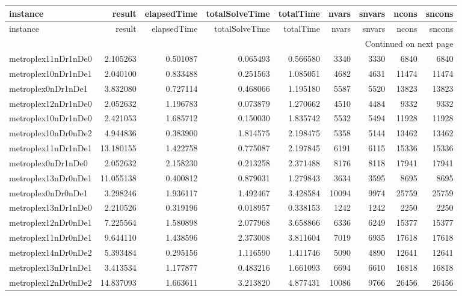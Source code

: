 \begin{longtable}{|l|r|r|r|r|r|r|r|r|}
\toprule
instance & result & elapsedTime & totalSolveTime & totalTime & nvars & snvars & ncons & sncons \\
\midrule
\endfirsthead
\toprule
instance & result & elapsedTime & totalSolveTime & totalTime & nvars & snvars & ncons & sncons \\
\midrule
\endhead
\midrule
\multicolumn{9}{r}{Continued on next page} \\
\midrule
\endfoot
\bottomrule
\endlastfoot
metroplex11nDr1nDe0 & 2.105263 & 0.501087 & 0.065493 & 0.566580 & 3340 & 3330 & 6840 & 6840 \\
metroplex10nDr1nDe1 & 2.040100 & 0.833488 & 0.251563 & 1.085051 & 4682 & 4631 & 11474 & 11474 \\
metroplex0nDr1nDe1 & 3.832080 & 0.727114 & 0.468066 & 1.195180 & 5587 & 5520 & 13823 & 13823 \\
metroplex12nDr1nDe0 & 2.052632 & 1.196783 & 0.073879 & 1.270662 & 4510 & 4484 & 9332 & 9332 \\
metroplex10nDr1nDe0 & 2.421053 & 1.685712 & 0.150030 & 1.835742 & 5532 & 5494 & 11928 & 11928 \\
metroplex10nDr0nDe2 & 4.944836 & 0.383900 & 1.814575 & 2.198475 & 5358 & 5144 & 13462 & 13462 \\
metroplex11nDr1nDe1 & 13.180155 & 1.422758 & 0.775087 & 2.197845 & 6191 & 6115 & 15336 & 15336 \\
metroplex0nDr1nDe0 & 2.052632 & 2.158230 & 0.213258 & 2.371488 & 8176 & 8118 & 17941 & 17941 \\
metroplex13nDr0nDe1 & 11.055138 & 0.400812 & 0.879031 & 1.279843 & 3634 & 3595 & 8695 & 8695 \\
metroplex0nDr0nDe1 & 3.298246 & 1.936117 & 1.492467 & 3.428584 & 10094 & 9974 & 25759 & 25759 \\
metroplex13nDr1nDe0 & 2.210526 & 0.319196 & 0.018957 & 0.338153 & 1242 & 1242 & 2250 & 2250 \\
metroplex12nDr0nDe1 & 7.225564 & 1.580898 & 2.077968 & 3.658866 & 6336 & 6249 & 15377 & 15377 \\
metroplex11nDr0nDe1 & 9.644110 & 1.438596 & 2.373008 & 3.811604 & 7019 & 6935 & 17618 & 17618 \\
metroplex14nDr0nDe2 & 5.393484 & 0.295156 & 1.116590 & 1.411746 & 5090 & 4890 & 12641 & 12641 \\
metroplex13nDr1nDe1 & 3.413534 & 1.177877 & 0.483216 & 1.661093 & 6694 & 6610 & 16818 & 16818 \\
metroplex12nDr0nDe2 & 14.837093 & 1.663611 & 3.213820 & 4.877431 & 10086 & 9766 & 26456 & 26456 \\

\end{longtable}
